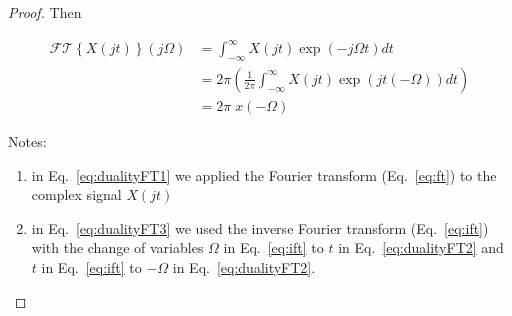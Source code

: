 \documentclass[12pt]{article}
\begin{document}
\begin{appendices}
\begin{proof}
        Then

        \begin{align}
            \mathcal{FT}\left\{X(jt)\right\}(j\Omega)&=\int_{-\infty}^\infty X(jt)\exp\left(-j\Omega t\right)dt\label{eq:dualityFT1}\\
                                                     &=2\pi\left(\frac{1}{2\pi}\int_{-\infty}^\infty X(jt)\exp\left(jt(-\Omega)\right)dt\right)\label{eq:dualityFT2}\\
                                                     &=2\pi\;x(-\Omega)\label{eq:dualityFT3}
        \end{align}

        Notes:

        \begin{enumerate}

            \item in Eq.~\ref{eq:dualityFT1} we applied the Fourier transform (Eq.~\ref{eq:ft}) to the complex signal $X(jt)$

            \item in Eq.~\ref{eq:dualityFT3} we used the inverse Fourier
                transform (Eq.~\ref{eq:ift}) with the change of variables
                $\Omega$ in Eq.~\ref{eq:ift} to $t$ in Eq.~\ref{eq:dualityFT2}
                and $t$ in Eq.~\ref{eq:ift} to $-\Omega$ in
                Eq.~\ref{eq:dualityFT2}.

        \end{enumerate}
    \end{proof}

\end{appendices}



\end{document}
